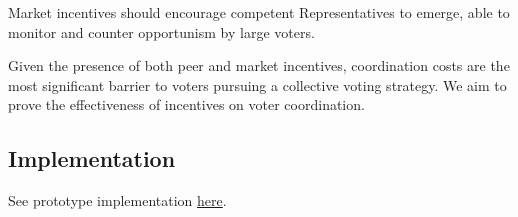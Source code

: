 \documentclass[
]{article}
\begin{document}
Market incentives should encourage competent Representatives to emerge,
able to monitor and counter opportunism by large voters.

Given the presence of both peer and market incentives, coordination
costs are the most significant barrier to voters pursuing a collective
voting strategy. We aim to prove the effectiveness of incentives on
voter coordination.

\hypertarget{implementation}{%
\subsection{Implementation}\label{implementation}}

See prototype implementation
\href{https://github.com/butterymoney/molten/}{here}.
\end{document}
